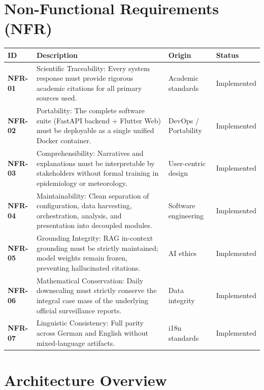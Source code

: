 \documentclass[11pt,a4paper]{article}
\begin{document}
\section{Non-Functional Requirements (NFR)}

\begin{longtable}{@{}>{\bfseries}p{1.6cm} L{7.4cm} L{3.6cm} L{2.4cm}@{}}
\toprule
ID & Description & Origin & Status \\
\midrule
\endhead
NFR-01 & Scientific Traceability: Every system response must provide rigorous academic citations for all primary sources used. & Academic standards & Implemented \\
NFR-02 & Portability: The complete software suite (FastAPI backend + Flutter Web) must be deployable as a single unified Docker container. & DevOps / Portability & Implemented \\
NFR-03 & Comprehensibility: Narratives and explanations must be interpretable by stakeholders without formal training in epidemiology or meteorology. & User-centric design & Implemented \\
NFR-04 & Maintainability: Clean separation of configuration, data harvesting, orchestration, analysis, and presentation into decoupled modules. & Software engineering & Implemented \\
NFR-05 & Grounding Integrity: RAG in-context grounding must be strictly maintained; model weights remain frozen, preventing hallucinated citations. & AI ethics & Implemented \\
NFR-06 & Mathematical Conservation: Daily downscaling must strictly conserve the integral case mass of the underlying official surveillance reports. & Data integrity & Implemented \\
NFR-07 & Linguistic Consistency: Full parity across German and English without mixed-language artifacts. & i18n standards & Implemented \\
\bottomrule
\end{longtable}

\section{Architecture Overview}
\end{document}
